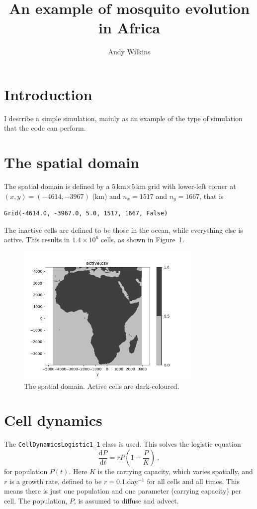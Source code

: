 \documentclass{article}
\title{An example of mosquito evolution in Africa}
\author{Andy Wilkins}
\begin{document}
\maketitle

\section{Introduction}

I describe a simple simulation, mainly as an example of the type of simulation that the code can perform.

\section{The spatial domain}

The spatial domain is defined by a $5$\,km$\times 5$\,km grid with lower-left corner at $(x,y)=(-4614,-3967)$ (km) and $n_{x}=1517$ and $n_{y}=1667$, that is
\begin{verbatim}
Grid(-4614.0, -3967.0, 5.0, 1517, 1667, False)
\end{verbatim}
The inactive cells are defined to be those in the ocean, while everything else is active.  This results in $1.4\times 10^{6}$ cells, as shown in Figure~\ref{active_inactive.fig}.

\begin{figure}[htb]
  \centering
  \includegraphics[width=9cm]{active.png}
  \caption{\label{active_inactive.fig}The spatial domain.  Active cells are dark-coloured.}
\end{figure}


\section{Cell dynamics}

The {\tt CellDynamicsLogistic1\_1} class is used.  This solves the logistic equation
\begin{equation}
  \frac{{\mathrm d}P}{{\mathrm d}t} = rP\left(1 - \frac{P}{K}\right) \ ,
\end{equation}
for population $P(t)$.  Here $K$ is the carrying capacity, which varies spatially, and $r$ is a growth rate, defined to be $r=0.1$.day$^{-1}$ for all cells and all times.  This means there is just one population and one parameter (carrying capacity) per cell.  The population, $P$, is assumed to diffuse and advect.
\end{document}
